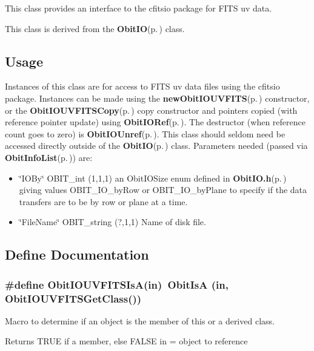 This class provides an interface to the cfitsio package for FITS uv data.

This class is derived from the {\bf Obit\-IO}{\rm (p.\,\pageref{structObitIO})} class.\subsection{Usage}\label{ObitIOUVFITS_8h_ObitIOUVFITSUsage}
Instances of this class are for access to FITS uv data files using the cfitsio package. Instances can be made using the {\bf new\-Obit\-IOUVFITS}{\rm (p.\,\pageref{ObitIOUVFITS_8c_a18})} constructor, or the {\bf Obit\-IOUVFITSCopy}{\rm (p.\,\pageref{ObitIOUVFITS_8c_a23})} copy constructor and pointers copied (with reference pointer update) using {\bf Obit\-IORef}{\rm (p.\,\pageref{ObitIO_8h_a1})}. The destructor (when reference count goes to zero) is {\bf Obit\-IOUnref}{\rm (p.\,\pageref{ObitIO_8h_a0})}. This class should seldom need be accessed directly outside of the {\bf Obit\-IO}{\rm (p.\,\pageref{structObitIO})} class. Parameters needed (passed via {\bf Obit\-Info\-List}{\rm (p.\,\pageref{structObitInfoList})}) are: \begin{itemize}
\item \char`\"{}IOBy\char`\"{} OBIT\_\-int (1,1,1) an Obit\-IOSize enum defined in {\bf Obit\-IO.h}{\rm (p.\,\pageref{ObitIO_8h})} giving values OBIT\_\-IO\_\-by\-Row or OBIT\_\-IO\_\-by\-Plane to specify if the data transfers are to be by row or plane at a time. \item \char`\"{}File\-Name\char`\"{} OBIT\_\-string (?,1,1) Name of disk file.\end{itemize}


\subsection{Define Documentation}
\subsubsection{\setlength{\rightskip}{0pt plus 5cm}\#define Obit\-IOUVFITSIs\-A(in)\ Obit\-Is\-A (in, Obit\-IOUVFITSGet\-Class())}\label{ObitIOUVFITS_8h_a2}


Macro to determine if an object is the member of this or a derived class. 

Returns TRUE if a member, else FALSE in = object to reference 
